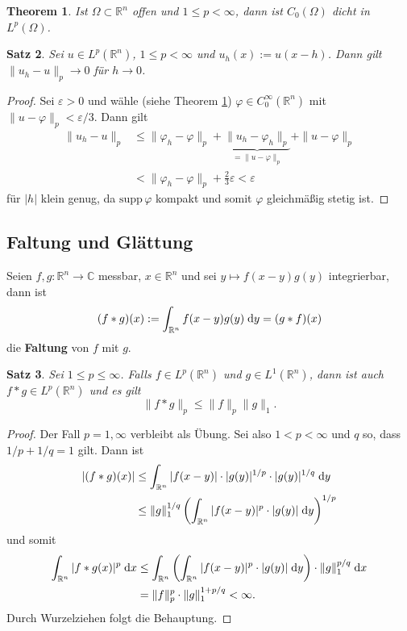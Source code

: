 \documentclass[
paper=a4,
bibtotocnumbered,
liststotocnumbered,
tablecaptionabove,
pointlessnumbers,
twoside,
openright,
10pt
]
{report}
\newcommand{\supp}{\mathrm{supp}\,}
\let\phi\varphi
\let\epsilon\varepsilon
\newtheorem{thm}{Theorem}[chapter]
\newtheorem{satz}[thm]{Satz}
\theoremstyle{definition}
\numberwithin{equation}{chapter}
\begin{document}
\begin{thm}\label{thm1}
Ist $\Omega\subset\mathbb{R}^n$ offen und $1\leq p<\infty$, dann ist $C_0(\Omega)$ dicht in $L^p(\Omega)$.
\end{thm}

\begin{satz}\label{satz2}
Sei $u\in L^p(\mathbb{R}^n)$, $1\leq p<\infty$ und $u_h(x):= u(x-h)$. Dann gilt $\|u_h-u\|_p\rightarrow 0$ für $h\rightarrow 0$.
\end{satz}
\begin{proof}
Sei $\epsilon >0$ und wähle (siehe Theorem \ref{thm1}) $\phi\in C_0^\infty(\mathbb{R}^n)$ mit $\|u-\phi\|_p<\epsilon/3$. Dann gilt
\begin{align}
\|u_h-u\|_p &\leq \|\phi_h-\phi\|_p+ \underbrace{\|u_h-\phi_h\|_p}_{=\|u-\phi\|_p} +\|u-\phi\|_p \\
&< \|\phi_h-\phi\|_p +\frac{2}{3}\epsilon <\epsilon
\end{align}
für $|h|$ klein genug, da $\supp\phi$ kompakt und somit $\phi$ gleichmäßig stetig ist.
\end{proof}

\subsection*{Faltung und Glättung}
Seien $f,g:\mathbb{R}^n\rightarrow\mathbb{C}$ messbar, $x\in\mathbb{R}^n$ und sei $y\mapsto f(x-y)g(y)$ integrierbar, dann ist
\begin{equation}
(f\ast g)(x):= \int_{\mathbb{R}^n} f(x-y)g(y)\;\mathrm{d} y=(g\ast f)(x)
\end{equation}
die \textbf{Faltung} von $f$ mit $g$.

\begin{satz}\label{satz3}
Sei $1\leq p\leq \infty$. Falls $f\in L^p(\mathbb{R}^n)$ und $g\in L^1(\mathbb{R}^n)$, dann ist auch $f\ast g\in L^p(\mathbb{R}^n)$ und es gilt
\begin{equation}
\|f\ast g\|_p\leq \|f\|_p\|g\|_1.
\end{equation}
\end{satz}
\begin{proof}
Der Fall $p=1,\infty$ verbleibt als Übung. Sei also $1<p<\infty$ und $q$ so, dass $1/p+1/q=1$ gilt. Dann ist
\begin{align}
|(f\ast g)(x)| &\leq \int_{\mathbb{R}^n} |f(x-y)|\cdot |g(y)|^{1/p}\cdot |g(y)|^{1/q}\;\mathrm{d} y \\
&\leq \|g\|_1^{1/q}
\left(
\int_{\mathbb{R}^n} |f(x-y)|^p\cdot  |g(y)|\;\mathrm{d} y
\right)^{1/p}
\end{align}
und somit
\begin{align}
\int_{\mathbb{R}^n}|f\ast g(x)|^p\;\mathrm{d} x 
&\leq \int_{\mathbb{R}^n} \left(\int_{\mathbb{R}^n} |f(x-y)|^p\cdot |g(y)|\;\mathrm{d} y\right)\cdot \|g\|_1^{p/q} \;\mathrm{d} x \\
&= \|f\|_p^p\cdot \|g\|_1^{1+p/q} <\infty.
\end{align}
Durch Wurzelziehen folgt die Behauptung.
\end{proof}
\end{document}
